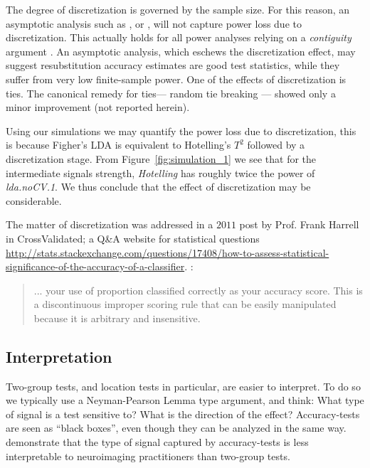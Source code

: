 \documentclass[]{bio}
\begin{document}
The degree of discretization is governed by the sample size. 
For this reason, an asymptotic analysis such as \cite{ramdas_classification_2016}, or \cite{golland_permutation_2005}, will not capture power loss due to discretization. This actually holds for all power analyses relying on a \emph{contiguity} argument \cite[Ch.6]{vaart_asymptotic_1998}.
An asymptotic analysis, which eschews the discretization effect,  may suggest resubstitution accuracy estimates are good test statistics, while they suffer from very low finite-sample power. 
One of the effects of discretization is ties. 
The canonical remedy for ties--- random tie breaking --- showed only a minor improvement (not reported herein).

Using our simulations we may quantify the power loss due to discretization, this is because Figher's LDA is equivalent to Hotelling's $T^2$ followed by a discretization stage. 
From Figure~\ref{fig:simulation_1} we see that for the intermediate signals strength, \emph{Hotelling} has roughly twice the power of \emph{lda.noCV.1}.
We thus conclude that the effect of discretization may be considerable. 


The matter of discretization was addressed in a $2011$ post by Prof. Frank Harrell in \textsf{CrossValidated}; a Q\&A website for statistical questions \url{http://stats.stackexchange.com/questions/17408/how-to-assess-statistical-significance-of-the-accuracy-of-a-classifier}. :
\begin{quote}
	... your use of proportion classified correctly as your accuracy score. This is a discontinuous improper scoring rule that can be easily manipulated because it is arbitrary and insensitive.
\end{quote}





\subsection{Interpretation}
Two-group tests, and location tests in particular, are easier to interpret. 
To do so we typically use a Neyman-Pearson Lemma type argument, and think:
What type of signal is a test sensitive to?
What is the direction of the effect? 
Accuracy-tests are seen as ``black boxes'', even though they can be analyzed in the same way. 
\citet{gilron2017s} demonstrate that the type of signal captured by accuracy-tests is less interpretable to neuroimaging practitioners than two-group tests. 
\end{document}
